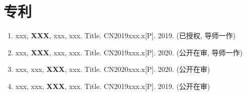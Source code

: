 \documentclass[]{WHUMaster-chapter-center} %
\begin{document}
\section*{专利}
\begin{enumerate}[parsep=1.ex]
\renewcommand\labelenumi{[\theenumi]}  %
\item
xxx, \textbf{XXX}, xxx, xxx. Title. CN2019xxx.x[P]. 2019. (已授权, 导师一作)

\item
xxx, \textbf{XXX}, xxx, xxx. Title. CN2019xxx.x[P]. 2020.  (公开在审, 导师一作)


\item
xxx, xxx, \textbf{XXX}, xxx. Title. CN2020xxx.x[P]. 2020. (公开在审)

\item
xxx, xxx, \textbf{XXX}, xxx. Title. CN2019xxx.x[P]. 2019. (公开在审)

\end{enumerate}

\backmatter
\cleardoublepage
\end{document}
